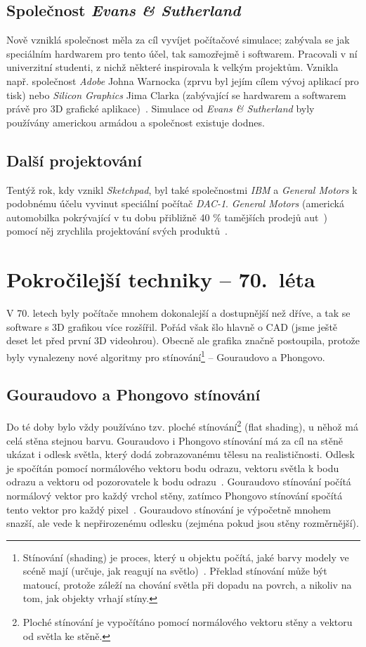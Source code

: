 \documentclass[a4paper, 11pt]{report}
\begin{document}
\begin{chapterwithoutpagebreak}
\section{Společnost \emph{Evans \& Sutherland}}
Nově vzniklá společnost měla za cíl vyvíjet počítačové simulace; zabývala se jak speciálním hardwarem pro tento účel, tak samozřejmě i softwarem. Pracovali v ní univerzitní studenti, z nichž některé inspirovala k velkým projektům. Vznikla např. společnost \emph{Adobe} Johna Warnocka (zprvu byl jejím cílem vývoj aplikací pro tisk) nebo \emph{Silicon Graphics} Jima Clarka (zabývající se hardwarem a softwarem právě pro 3D grafické aplikace)~\cite{es:birth-of-cgi}. Simulace od \emph{Evans \& Sutherland} byly používány americkou armádou a společnost existuje dodnes.

\section{Další projektování}
Tentýž rok, kdy vznikl \emph{Sketchpad}, byl také společnostmi \emph{IBM} a \emph{General Motors} k podobnému účelu vyvinut speciální počítač \emph{DAC-1}. \emph{General Motors} (americká automobilka pokrývající v tu dobu přibližně 40 \% tamějších prodejů aut~\cite{britannica:gm}) pomocí něj zrychlila projektování svých produktů~\cite{ufo:history}.

\chapter{Pokročilejší techniky -- 70.~léta}
V 70. letech byly počítače mnohem dokonalejší a dostupnější než dříve, a tak se software s 3D grafikou více rozšířil. Pořád však šlo hlavně o CAD (jsme ještě deset let před první 3D videohrou). Obecně ale grafika značně postoupila, protože byly vynalezeny nové algoritmy pro stínování\footnote{Stínování (shading) je proces, který u objektu počítá, jaké barvy modely ve scéně mají (určuje, jak reagují na světlo)~\cite{scratchapixel:shading}. Překlad stínování může být matoucí, protože záleží na chování světla při dopadu na povrch, a nikoliv na tom, jak objekty vrhají stíny.} -- Gouraudovo a Phongovo. 

\section{Gouraudovo a Phongovo stínování}
Do té doby bylo vždy používáno tzv. ploché stínování\footnote{Ploché stínování je vypočítáno pomocí normálového vektoru stěny a vektoru od světla ke stěně.} (flat shading), u něhož má celá stěna stejnou barvu. Gouraudovo i Phongovo stínování má za cíl na stěně ukázat i odlesk světla, který dodá zobrazovanému tělesu na realističnosti. Odlesk je spočítán pomocí normálového vektoru bodu odrazu, vektoru světla k bodu odrazu a vektoru od pozorovatele k bodu odrazu~\cite{javatpoint:gouraud}. Gouraudovo stínování počítá normálový vektor pro každý vrchol stěny, zatímco Phongovo stínování spočítá tento vektor pro každý pixel~\cite{javatpoint:phong}. Gouraudovo stínování je výpočetně mnohem snazší, ale vede k nepřirozenému odlesku (zejména pokud jsou stěny rozměrnější).


\end{chapterwithoutpagebreak}
\end{document}
